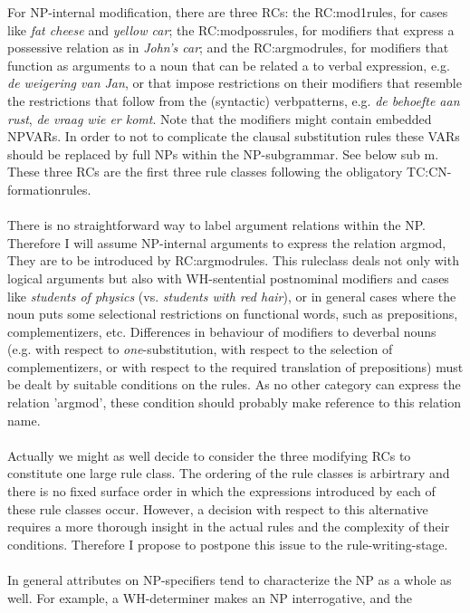 For NP-internal modification, there are three RCs: the RC:mod1rules, for cases
like {\em fat cheese} 
and {\em yellow car}; the RC:modpossrules, for modifiers that
express a possessive relation as in {\em John's car}; and the RC:argmodrules,
for modifiers that function as arguments to a noun that can be related a to
verbal expression, e.g. {\em de weigering van Jan}, or that impose restrictions
on their modifiers that resemble the restrictions that follow from the
(syntactic) verbpatterns, e.g. {\em de behoefte aan rust}, {\em de vraag wie er
komt}. Note that the modifiers might contain embedded NPVARs. In order to
not to complicate the clausal substitution rules these VARs should be replaced 
by full NPs within the NP-subgrammar. See below sub m.
These three RCs are the first three rule classes following the
obligatory TC:CN-formationrules.\\ \\
There is no straightforward way to label argument relations within the NP.
Therefore I will assume NP-internal arguments to express the relation argmod,
They are to be introduced by RC:argmodrules. This ruleclass deals not only with
logical arguments but also with WH-sentential postnominal modifiers and cases
like {\em students of physics} (vs. {\em students with red hair}), or in
general cases where the noun puts some selectional restrictions on functional
words, such as prepositions, complementizers, etc. Differences in behaviour of
modifiers to deverbal nouns (e.g. with respect to {\em one}-substitution, with
respect to the selection of complementizers, or with respect to the required
translation of prepositions) must be dealt by suitable conditions on the rules.
As no other category can express the relation 'argmod', these condition
should probably make reference to this relation name.\\ \\ 
Actually we might as well decide to consider the three modifying RCs to
constitute one large rule class. The ordering of the rule classes is arbirtrary
and there is no fixed surface order in which the expressions introduced by each
of these rule classes occur. However, a decision with respect to this
alternative requires a more thorough insight in the actual rules and the
complexity of their conditions. Therefore I propose to postpone this issue to
the rule-writing-stage.\\ \\ 
In general attributes on NP-specifiers tend to characterize the NP as a whole
as well. For example, a WH-determiner makes an NP interrogative, and the
